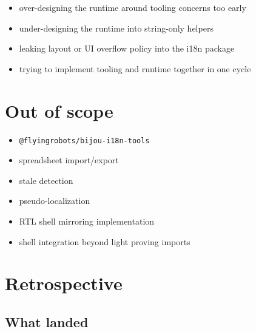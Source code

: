 \begin{itemize}
\tightlist
\item
  over-designing the runtime around tooling concerns too early
\item
  under-designing the runtime into string-only helpers
\item
  leaking layout or UI overflow policy into the i18n package
\item
  trying to implement tooling and runtime together in one cycle
\end{itemize}

\section{Out of scope}\label{record-188-out-of-scope}

\begin{itemize}
\tightlist
\item
  \texttt{@\allowbreak{}f\allowbreak{}l\allowbreak{}y\allowbreak{}i\allowbreak{}n\allowbreak{}g\allowbreak{}r\allowbreak{}o\allowbreak{}b\allowbreak{}o\allowbreak{}t\allowbreak{}s\allowbreak{}/\allowbreak{}b\allowbreak{}i\allowbreak{}j\allowbreak{}o\allowbreak{}u\allowbreak{}-\allowbreak{}i\allowbreak{}1\allowbreak{}8\allowbreak{}n\allowbreak{}-\allowbreak{}t\allowbreak{}o\allowbreak{}o\allowbreak{}l\allowbreak{}s}
\item
  spreadsheet import/export
\item
  stale detection
\item
  pseudo-localization
\item
  RTL shell mirroring implementation
\item
  shell integration beyond light proving imports
\end{itemize}

\section{Retrospective}\label{record-188-retrospective}

\subsection{What landed}\label{record-188-what-landed}

